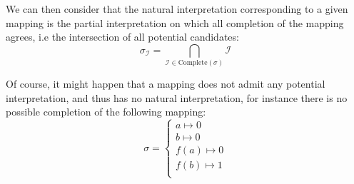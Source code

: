 \documentclass{article}
\begin{document}
We can then consider that the natural interpretation corresponding to a given mapping is the
partial interpretation on which all completion of the mapping agrees, i.e the intersection of
all potential candidates:
\[
  \sigma_\mathcal{I} = \bigcap_{ \mathcal{I} \in \text{Complete}(\sigma) } \mathcal{I}
\]

Of course, it might happen that a mapping does not admit any potential interpretation,
and thus has no natural interpretation, for instance there is no possible completion of the
following mapping:
\[
  \sigma = \left\{
    \begin{matrix}
      a \mapsto 0 \\
      b \mapsto 0 \\
      f(a) \mapsto 0 \\
      f(b) \mapsto 1 \\
    \end{matrix}
  \right.
\]
\end{document}
